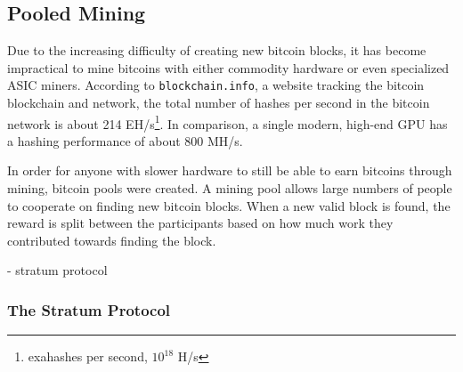 \subsection{Pooled Mining}
Due to the increasing difficulty of creating new bitcoin blocks, it has become impractical
to mine bitcoins with either commodity hardware or even specialized ASIC miners. According
to \texttt{blockchain.info}, a website tracking the bitcoin blockchain and network, the
total number of hashes per second in the bitcoin network is about 214 EH/s\footnote{exahashes per second, $10^18$ H/s}.
In comparison, a single modern, high-end GPU has a hashing performance of about 800 MH/s.

In order for anyone with slower hardware to still be able to earn bitcoins through mining,
bitcoin pools were created. A mining pool allows large numbers of people to cooperate on
finding new bitcoin blocks. When a new valid block is found, the reward is split between
the participants based on how much work they contributed towards finding the block.

- stratum protocol

\subsubsection{The Stratum Protocol}


